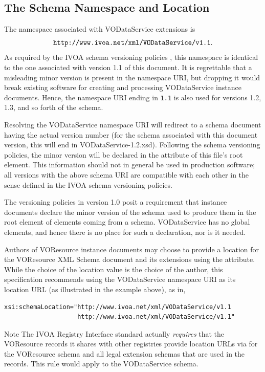 \documentclass[11pt,a4paper]{ivoa}
\begin{document}
\subsection{The Schema Namespace and Location}


The namespace associated with VODataService extensions is
$$\mbox{\texttt{http://www.ivoa.net/xml/VODataService/v1.1}}.$$
As required by the IVOA schema versioning policies
\citep{2018ivoa.spec.0529H}, this namespace is identical to the one
associated with version 1.1 of this document.  It is regrettable that a
misleading minor version is present in the namespace URI, but dropping
it would break existing software for creating and processing
VODataService instance documents.  Hence, the namespace URI ending in
\verb|1.1| is also used for versions 1.2, 1.3, and so forth of the
schema.

Resolving the VODataService namespace URI will redirect to a schema
document having the actual version number (for the schema associated
with this document version, this will end in VODataService-1.2.xsd).
Following the schema versioning policies, the minor version will be
declared in the  attribute of this file's root element.
This information should not in general be used in production software;
all versions with the above schema URI are compatible with each
other in the sense defined in the IVOA schema versioning policies.

The versioning policies in version 1.0 posit a requirement that instance
documents declare the minor version of the schema used to produce them
in the root element of elements coming from a schema.  VODataService has
no global elements, and hence there is no place for such a declaration,
nor is it needed.


Authors of VOResource instance documents may choose to
provide a location for the VOResource XML Schema document and its
extensions using the
 attribute.  While the choice of
the location value is the choice of the author, this specification
recommends using the VODataService namespace URI as its location URL
(as illustrated in the example above), as in,

\begin{lstlisting}[language=XML]
xsi:schemaLocation="http://www.ivoa.net/xml/VODataService/v1.1
                    http://www.ivoa.net/xml/VODataService/v1.1"
\end{lstlisting}


\begin{admonition}{Note}
The IVOA Registry Interface standard \citep{2018ivoa.spec.0723D}
       actually \emph{requires} that the VOResource records it
       shares with other registries provide location URLs via
        for the VOResource schema and
       all legal extension schemas that are used in the records.  This
       rule would apply to the VODataService schema.
\end{admonition}
\end{document}
